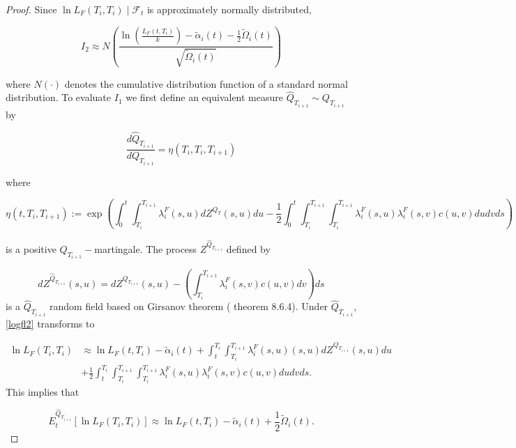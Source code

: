 \documentclass[11pt]{article}
\newcommand{\filt}{\ensuremath{\mathcal{F}}}
\begin{document}
\begin{proof}
Since $\ln L_F(T_i,T_i)\mid \filt_t$ is approximately normally distributed,  

\begin{equation}
    I_2\approx N\left(\frac{\ln\left(\frac{L_F(t,T_i)}{k}\right)-\tilde{\alpha}_i(t)-\frac{1}{2}\tilde{\Omega}_i(t)}{\sqrt{\tilde{\Omega}_i(t)}}\right)
\end{equation}

where $N(\cdot)$ denotes the cumulative distribution function of a standard normal distribution. To evaluate $I_1$ we first define an equivalent measure $\hat{Q}_{T_{i+1}}\sim Q_{T_{i+1}}$ by


    \begin{equation*}
    \frac{d\hat{Q}_{T_{i+1}}}{dQ_{T_{i+1}}}=\eta(T_i,T_i,T_{i+1})
\end{equation*}

where 

\begin{equation*}
    \eta(t,T_i,T_{i+1}):=\exp\left(\int_0^t\int_{T_i}^{T_{i+1}} \lambda_i^F(s,u)dZ^{Q_T}(s,u)du
    -\frac{1}{2}\int_0^t\int_{T_i}^{T_{i+1}}\int_{T_i}^{T_{i+1}} \lambda_i^F(s,u)\lambda_i^F(s,v)c(u,v)dudvds\right)
\end{equation*}

is a positive $Q_{T_{i+1}}-$martingale. The process $Z^{\hat{Q}_{T_{i+1}}}$ defined by

\begin{equation}\label{dzhat}
    dZ^{\hat{Q}_{T_{i+1}}}(s,u)= dZ^{{Q}_{T_{i+1}}}(s,u)-\left(\int_{T_i}^{T_{i+1}}\lambda_i^F(s,v)c(u,v)dv\right)ds
\end{equation}
is a  $\hat{Q}_{T_{i+1}}$ random field based on Girsanov theorem (\cite{oks} theorem 8.6.4). Under  $\hat{Q}_{T_{i+1}}$, \eqref{logfl2} transforms to 

\begin{equation}\label{logfltrans}
\begin{split}
    \ln L_F(T_i,T_i)&\approx\ln L_F(t,T_i)-\tilde{\alpha}_i(t)+\int_t^{T_i}\int_{T_i}^{T_{i+1}}\lambda^F_i(s,u)(s,u)dZ^{Q_{T_{i+1}}}(s,u)du\\
        &+\frac{1}{2}\int_t^{T_i}\int_{T_i}^{T_{i+1}}\int_{T_i}^{T_{i+1}}\lambda^F_i(s,u)\lambda^F_i(s,v)c(u,v)dudvds.
\end{split}
\end{equation}
This implies that


\begin{equation}\label{logehat}
    E_t^{\hat{Q}_{T_{i+1}}}[\ln L_F(T_i,T_i)]\approx\ln L_F(t,T_i)-\tilde{\alpha}_i(t)+\frac{1}{2}\tilde{\Omega}_i(t).
\end{equation}


\end{proof}
\end{document}
